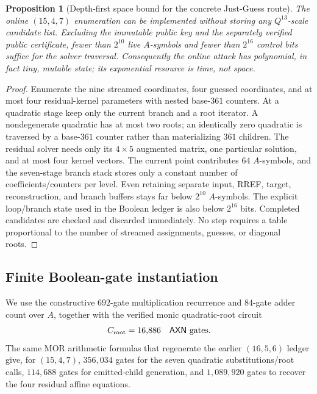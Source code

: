 \documentclass[11pt]{article}
\newtheorem{proposition}[theorem]{Proposition}
\newcommand{\AXN}{\mathsf{AXN}}
\begin{document}
\begin{proposition}[Depth-first space bound for the concrete Just-Guess route]
\label{prop:jg-lowspace}
The online $(15,4,7)$ enumeration can be implemented without storing any
$Q^{13}$-scale candidate list.  Excluding the immutable public key and the
separately verified public certificate, fewer than $2^{10}$ live $A$-symbols
and fewer than $2^{16}$ control bits suffice for the solver traversal.
Consequently the online attack has polynomial, in fact tiny, mutable state;
its exponential resource is time, not space.
\end{proposition}

\begin{proof}
Enumerate the nine streamed coordinates, four guessed coordinates, and at
most four residual-kernel parameters with nested base-$361$ counters.  At a
quadratic stage keep only the current branch and a root iterator.  A
nondegenerate quadratic has at most two roots; an identically zero quadratic
is traversed by a base-$361$ counter rather than materializing $361$ children.
The residual solver needs only its $4\times5$ augmented matrix, one particular
solution, and at most four kernel vectors.  The current point contributes
$64$ $A$-symbols, and the seven-stage branch stack stores only a constant
number of coefficients/counters per level.  Even retaining separate input,
RREF, target, reconstruction, and branch buffers stays far below $2^{10}$
$A$-symbols.  The explicit loop/branch state used in the Boolean ledger is
also below $2^{16}$ bits.  Completed candidates are checked and discarded
immediately.  No step requires a table proportional to the number of streamed
assignments, guesses, or diagonal roots.
\end{proof}

\subsection{Finite Boolean-gate instantiation}

We use the constructive $692$-gate multiplication recurrence and $84$-gate
adder count over $A$, together with the verified monic quadratic-root circuit
\begin{equation}
  C_{\rm root}=16{,}886\quad\AXN\text{ gates}.       \label{eq:jg-root-gates}
\end{equation}
The same MOR arithmetic formulas that regenerate the earlier $(16,5,6)$
ledger give, for $(15,4,7)$, $356{,}034$ gates for the seven quadratic
substitutions/root calls, $114{,}688$ gates for emitted-child generation, and
$1{,}089{,}920$ gates to recover the four residual affine equations.
\end{document}
